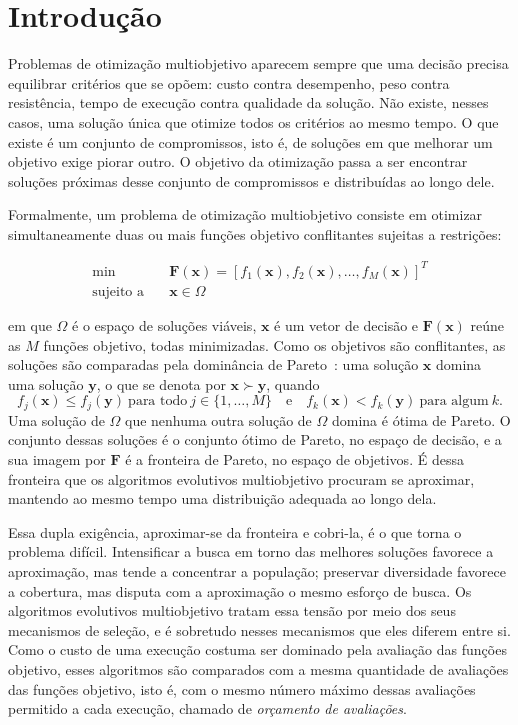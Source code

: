 
\chapter{Introdução}
\label{sec1}

Problemas de otimização multiobjetivo aparecem sempre que uma decisão precisa equilibrar critérios que se opõem: custo contra desempenho, peso contra resistência, tempo de execução contra qualidade da solução. Não existe, nesses casos, uma solução única que otimize todos os critérios ao mesmo tempo. O que existe é um conjunto de compromissos, isto é, de soluções em que melhorar um objetivo exige piorar outro. O objetivo da otimização passa a ser encontrar soluções próximas desse conjunto de compromissos e distribuídas ao longo dele.

Formalmente, um problema de otimização multiobjetivo consiste em otimizar simultaneamente duas ou mais funções objetivo conflitantes sujeitas a restrições:

\begin{align}
\label{eq:mop_definition}
\min \quad & \mathbf{F}(\mathbf{x}) = [f_1(\mathbf{x}), f_2(\mathbf{x}), \ldots, f_M(\mathbf{x})]^T \\
\text{sujeito a} \quad & \mathbf{x} \in \Omega \nonumber
\end{align}

\noindent em que $\Omega$ é o espaço de soluções viáveis, $\mathbf{x}$ é um vetor de decisão e $\mathbf{F}(\mathbf{x})$ reúne as $M$ funções objetivo, todas minimizadas. Como os objetivos são conflitantes, as soluções são comparadas pela dominância de Pareto~\cite{coello2007evolutionary}: uma solução $\mathbf{x}$ domina uma solução $\mathbf{y}$, o que se denota por $\mathbf{x} \succ \mathbf{y}$, quando
\begin{equation}
\label{eq:dominancia}
f_j(\mathbf{x}) \leq f_j(\mathbf{y}) \ \text{para todo}\ j \in \{1, \ldots, M\} \quad \text{e} \quad f_k(\mathbf{x}) < f_k(\mathbf{y}) \ \text{para algum}\ k.
\end{equation}
Uma solução de $\Omega$ que nenhuma outra solução de $\Omega$ domina é ótima de Pareto. O conjunto dessas soluções é o conjunto ótimo de Pareto, no espaço de decisão, e a sua imagem por $\mathbf{F}$ é a fronteira de Pareto, no espaço de objetivos. É dessa fronteira que os algoritmos evolutivos multiobjetivo procuram se aproximar, mantendo ao mesmo tempo uma distribuição adequada ao longo dela.

Essa dupla exigência, aproximar-se da fronteira e cobri-la, é o que torna o problema difícil. Intensificar a busca em torno das melhores soluções favorece a aproximação, mas tende a concentrar a população; preservar diversidade favorece a cobertura, mas disputa com a aproximação o mesmo esforço de busca. Os algoritmos evolutivos multiobjetivo tratam essa tensão por meio dos seus mecanismos de seleção, e é sobretudo nesses mecanismos que eles diferem entre si. Como o custo de uma execução costuma ser dominado pela avaliação das funções objetivo, esses algoritmos são comparados com a mesma quantidade de avaliações das funções objetivo, isto é, com o mesmo número máximo dessas avaliações permitido a cada execução, chamado de \emph{orçamento de avaliações}.

